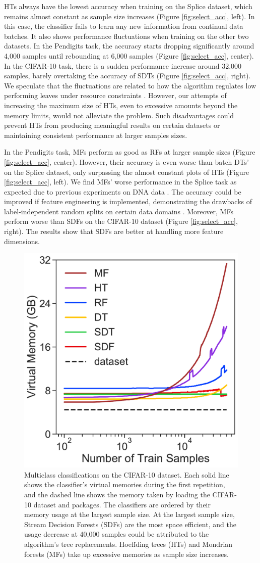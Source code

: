 HTs always have the lowest accuracy when training on the Splice dataset, which remains almost constant as sample size increases (Figure \ref{fig:select_acc}, left). In this case, the classifier fails to learn any new information from continual data batches.
It also shows performance fluctuations when training on the other two datasets. In the Pendigits task, the accuracy starts dropping significantly around 4,000 samples until rebounding at 6,000 samples (Figure \ref{fig:select_acc}, center). In the CIFAR-10 task, there is a sudden performance increase around 32,000 samples, barely overtaking the accuracy of SDTs (Figure \ref{fig:select_acc}, right).
We speculate that the fluctuations are related to how the algorithm regulates low performing leaves under resource constraints \citep{domingos_mining_2000}. However, our attempts of increasing the maximum size of HTs, even to excessive amounts beyond the memory limits, would not alleviate the problem. 
Such disadvantages could prevent HTs from producing meaningful results on certain datasets or maintaining consistent performance at larger samples sizes.

In the Pendigits task, MFs perform as good as RFs at larger sample sizes (Figure \ref{fig:select_acc}, center). However, their accuracy is even worse than batch DTs' on the Splice dataset, only surpassing the almost constant plots of HTs (Figure \ref{fig:select_acc}, left). 
We find MFs' worse performance in the Splice task as expected due to previous experiments on DNA data \citep{lakshminarayanan_mondrian_2014}. 
The accuracy could be improved if feature engineering is implemented, demonstrating the drawbacks of label-independent random splits on certain data domains \citep{roy_mondrian_2009, ziegler_mining_2014}.
Moreover, MFs perform worse than SDFs on the CIFAR-10 dataset (Figure \ref{fig:select_acc}, right). The results show that SDFs are better at handling more feature dimensions.

\begin{figure}[!htb]
\centering
\includegraphics[width=0.4\columnwidth]{select_cifar_mem}
  \caption{Multiclass classifications on the CIFAR-10 dataset. Each solid line shows the classifier's virtual memories during the first repetition, and the dashed line shows the memory taken by loading the CIFAR-10 dataset and packages. The classifiers are ordered by their memory usage at the largest sample size. At the largest sample size, Stream Decision Forests (SDFs) are the most space efficient, and the usage decrease at 40,000 samples could be attributed to the algorithm's tree replacements. Hoeffding trees (HTs) and Mondrian forests (MFs) take up excessive memories as sample size increases.
  }
\label{fig:select_cifar_mem}
\end{figure}

